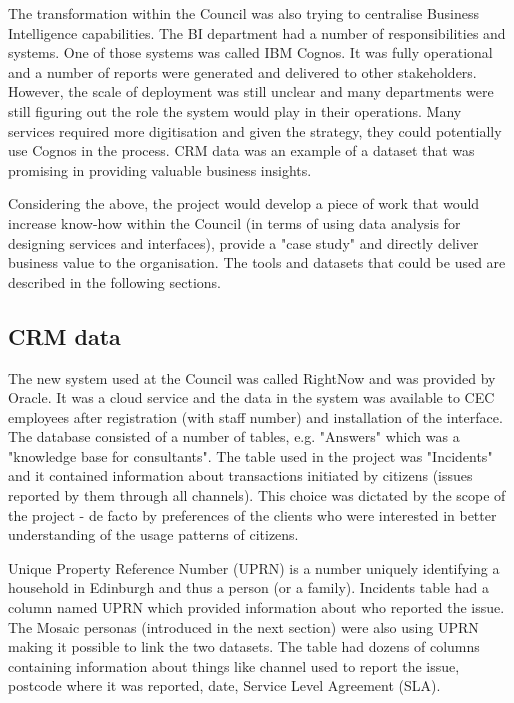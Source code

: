 The transformation within the Council was also trying to centralise Business Intelligence capabilities. The BI department had a number of responsibilities and systems. One of those systems was called IBM Cognos. It was fully operational and a number of reports were generated and delivered to other stakeholders. However, the scale of deployment was still unclear and many departments were still figuring out the role the system would play in their operations. Many services required more digitisation and given the strategy, they could potentially use Cognos in the process. CRM data was an example of a dataset that was promising in providing valuable business insights.

Considering the above, the project would develop a piece of work that would increase know-how within the Council (in terms of using data analysis for designing services and interfaces), provide a "case study" and directly deliver business value to the organisation. The tools and datasets that could be used are described in the following sections.

		\subsection{CRM data}
		
The new system used at the Council was called RightNow and was provided by Oracle. It was a cloud service and the data in the system was available to CEC employees after registration (with staff number) and installation of the interface. The database consisted of a number of tables, e.g. "Answers" which was a "knowledge base for consultants". The table used in the project was "Incidents" and it contained information about transactions initiated by citizens (issues reported by them through all channels). This choice was dictated by the scope of the project - de facto by preferences of the clients who were interested in better understanding of the usage patterns of citizens.

Unique Property Reference Number (UPRN) is a number uniquely identifying a household in Edinburgh and thus a person (or a family). Incidents table had a column named UPRN which provided information about who reported the issue. The Mosaic personas (introduced in the next section) were also using UPRN making it possible to link the two datasets. The table had dozens of columns containing information about things like channel used to report the issue, postcode where it was reported, date, Service Level Agreement (SLA).

